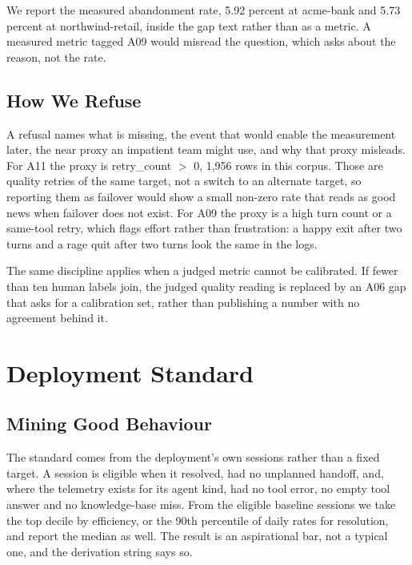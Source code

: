 \documentclass[8pt,twocolumn,a4paper]{extarticle}
\begin{document}
We report the measured abandonment rate, 5.92 percent at acme-bank and
5.73 percent at northwind-retail, inside the gap text rather than as a
metric. A measured metric tagged A09 would misread the question, which
asks about the reason, not the rate.

\subsection{How We Refuse}

A refusal names what is missing, the event that would enable the
measurement later, the near proxy an impatient team might use, and why
that proxy misleads. For A11 the proxy is retry\_count $>$ 0, 1,956 rows
in this corpus. Those are quality retries of the same target, not a
switch to an alternate target, so reporting them as failover would show
a small non-zero rate that reads as good news when failover does not
exist. For A09 the proxy is a high turn count or a same-tool retry,
which flags effort rather than frustration: a happy exit after two turns
and a rage quit after two turns look the same in the logs.

The same discipline applies when a judged metric cannot be calibrated.
If fewer than ten human labels join, the judged quality reading is
replaced by an A06 gap that asks for a calibration set, rather than
publishing a number with no agreement behind it.


\section{Deployment Standard}

\subsection{Mining Good Behaviour}

The standard comes from the deployment's own sessions rather than a
fixed target. A session is eligible when it resolved, had no unplanned
handoff, and, where the telemetry exists for its agent kind, had no tool
error, no empty tool answer and no knowledge-base miss. From the
eligible baseline sessions we take the top decile by efficiency, or the
90th percentile of daily rates for resolution, and report the median as
well. The result is an aspirational bar, not a typical one, and the
derivation string says so.
\end{document}
